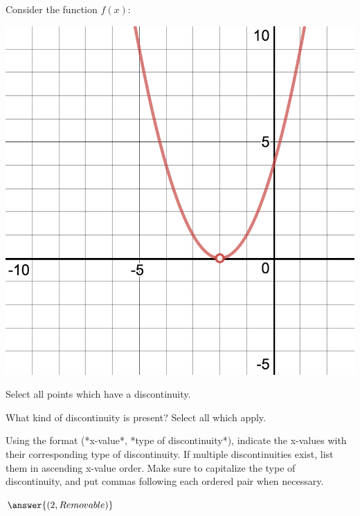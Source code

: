 \documentclass{ximera}
\begin{document}
\begin{question}
Consider the function $f(x)$:
\begin{image}
\includegraphics{continuity2}
\end{image}
Select all points which have a discontinuity.

\begin{selectAll}
\end{selectAll}

What kind of discontinuity is present? Select all which apply.

\begin{selectAll}
\end{selectAll}

Using the format (*x-value*, *type of discontinuity*), indicate the x-values with their corresponding type of discontinuity. If multiple discontinuities exist, list them in ascending x-value order. Make sure to capitalize the type of discontinuity, and put commas following each ordered pair when necessary.

$\answer{(2, Removable)}$
\end{question}
\end{document}
